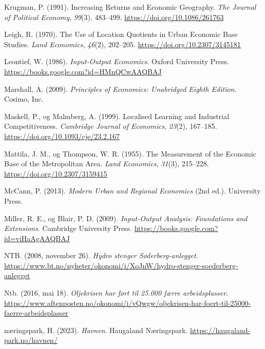 \documentclass[
]{article}
\newlength{\cslhangindent}
\newlength{\cslentryspacingunit} %
\newenvironment{CSLReferences}[2] %
 {%
  \setlength{\parindent}{0pt}
  \ifodd #1
  \let\oldpar\par
  \def\par{\hangindent=\cslhangindent\oldpar}
  \fi
  \setlength{\parskip}{#2\cslentryspacingunit}
 }%
 {}
\begin{document}
\begin{CSLReferences}{1}{0}
\leavevmode{}%
Krugman, P. (1991). Increasing {Returns} and {Economic Geography}.
\emph{The Journal of Political Economy}, \emph{99}(3), 483--499.
\url{https://doi.org/10.1086/261763}

\leavevmode{}%
Leigh, R. (1970). The {Use} of {Location Quotients} in {Urban Economic
Base Studies}. \emph{Land Economics}, \emph{46}(2), 202--205.
\url{https://doi.org/10.2307/3145181}

\leavevmode{}%
Leontief, W. (1986). \emph{Input-{Output Economics}}. {Oxford University
Press}. \url{https://books.google.com?id=HMnQCwAAQBAJ}

\leavevmode{}%
Marshall, A. (2009). \emph{Principles of {Economics}: {Unabridged Eighth
Edition}}. {Cosimo, Inc.}

\leavevmode{}%
Maskell, P., og Malmberg, A. (1999). Localised Learning and Industrial
Competitiveness. \emph{Cambridge Journal of Economics}, \emph{23}(2),
167--185. \url{https://doi.org/10.1093/cje/23.2.167}

\leavevmode{}%
Mattila, J. M., og Thompson, W. R. (1955). The {Measurement} of the
{Economic Base} of the {Metropolitan Area}. \emph{Land Economics},
\emph{31}(3), 215--228. \url{https://doi.org/10.2307/3159415}

\leavevmode{}%
McCann, P. (2013). \emph{Modern Urban and Regional Economics} (2nd ed.).
{University Press}.

\leavevmode{}%
Miller, R. E., og Blair, P. D. (2009). \emph{Input-{Output Analysis}:
{Foundations} and {Extensions}}. {Cambridge University Press}.
\url{https://books.google.com?id=viHaAgAAQBAJ}

\leavevmode{}%
NTB. (2008, november 26). \emph{Hydro stenger Søderberg-anlegget}.
\url{https://www.bt.no/nyheter/okonomi/i/XoJnW/hydro-stenger-soederberg-anlegget}

\leavevmode{}%
Ntb. (2016, mai 18). \emph{Oljekrisen har ført til 25.000 færre
arbeidsplasser}.
\url{https://www.aftenposten.no/okonomi/i/vQwgw/oljekrisen-har-foert-til-25000-faerre-arbeidsplasser}

\leavevmode{}%
næringspark, H. (2023). \emph{Havnen}. {Haugaland Næringspark}.
\url{https://haugaland-park.no/havnen/}


\end{CSLReferences}
\end{document}

